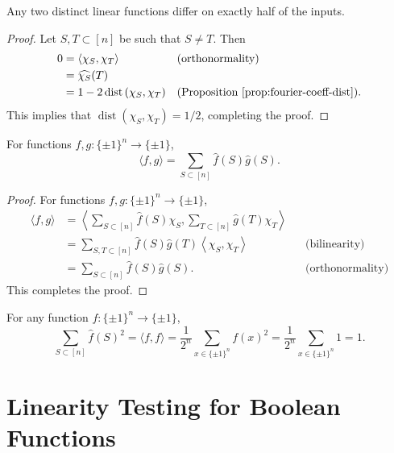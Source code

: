 \documentclass[letterpaper, reqno,11pt]{article}
\DeclareMathOperator{\dist}{dist}
\begin{document}
\begin{lemma}
  Any two distinct linear functions differ on exactly half of the inputs.
\end{lemma}

\begin{proof}
  Let $S, T \subset [n]$ be such that $S \neq T$. Then
  \begin{align*}
    0 &= \left\langle \chi_S, \chi_T \right\rangle && \text{(orthonormality)} \\
    &= \widehat{\chi_S}(T) \\
    &= 1 - 2\dist\left(\chi_S, \chi_T\right) && \text{(Proposition \ref{prop:fourier-coeff-dist})}.
  \end{align*}
  This implies that $\dist(\chi_S, \chi_T) = 1/2$, completing the proof.
\end{proof}

\begin{lemma}
  For functions $f, g : \{ \pm 1 \}^n \to \{ \pm 1 \}$,
  $$ \langle f, g \rangle = \sum_{S \subset [n]} \hat{f}(S) \hat{g}(S). $$
\end{lemma}

\begin{proof}
  For functions $f, g : \{ \pm 1 \}^n \to \{ \pm 1 \}$,
  \begin{align*}
    \langle f, g \rangle &= \left\langle \sum_{S \subset [n]} \hat{f}(S) \chi_S, \sum_{T \subset [n]} \hat{g}(T) \chi_T \right\rangle \\
    &= \sum_{S, T \subset [n]} \hat{f}(S) \hat{g}(T) \left\langle \chi_S, \chi_T \right\rangle && \text{(bilinearity)} \\
    &= \sum_{S \subset [n]} \hat{f}(S) \hat{g}(S). && \text{(orthonormality)}
  \end{align*}
  This completes the proof.
\end{proof}

\begin{corollary} \label{cor:bool-parseval}
  For any function $f : \{ \pm 1 \}^n \to \{ \pm 1 \}$,
  $$ \sum_{S \subset [n]} \hat{f}(S)^2 = \langle f, f \rangle = \frac{1}{2^n} \sum_{x \in \{ \pm  1\}^n} f(x)^2 = \frac{1}{2^n} \sum_{x \in \{ \pm  1\}^n} 1 = 1. $$
\end{corollary}

\section{Linearity Testing for Boolean Functions}
\end{document}
